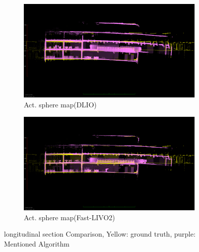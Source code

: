 \documentclass[conference]{IEEEtran}
\begin{document}
\begin{figure}
\centering
\begin{subfigure}{0.48\columnwidth}
    \centering
    \includegraphics[width=\textwidth]{pics/drifts_bending/dlio_bending.png}
    \caption{Act. sphere map(DLIO)}\label{fig:dlio_bending}
    \end{subfigure}
\begin{subfigure}{0.48\columnwidth}
    \centering
    \includegraphics[width=\textwidth]{pics/drifts_bending/livo_actuated_bending.png}
    \caption{Act. sphere map(Fast-LIVO2)}\label{fig:livo_bending}
\end{subfigure}
\hfill
\caption{longitudinal section Comparison, Yellow: ground truth, purple: Mentioned Algorithm}
\label{fig:bending}
\end{figure}
\end{document}
